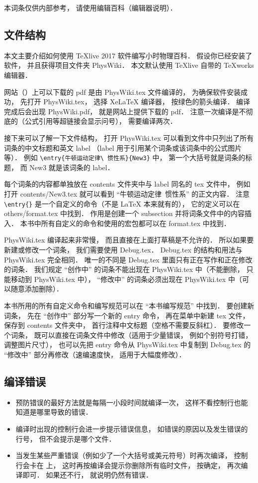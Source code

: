 
本词条仅供内部参考， 请使用编辑百科（编辑器说明）．

\subsection{文件结构}

本文主要介绍如何使用 TeXlive 2017 软件编写小时物理百科． 假设你已经安装了软件， 并且获得项目文件夹 PhysWiki． 本文默认使用 TeXlive 自带的 TeXworks 编辑器．

网站（）上可以下载的 pdf 是由 PhysWiki.tex 文件编译的， 为确保软件安装成功， 先打开 PhysWiki.tex， 选择 XeLaTeX 编译器， 按绿色的箭头编译． 编译完成后会出现 PhysWiki.pdf， 就是网站上提供下载的 pdf． 注意一次编译是不彻底的（公式引用等超链接会显示问号）， 需要编译两次．

接下来可以了解一下文件结构， 打开 PhysWiki.tex 可以看到文件中只列出了所有词条的中文标题和英文 label （label 用于引用某个词条或该词条中的公式图片等）． 例如 \lstinline|\entry{牛顿运动定律\ 惯性系}{New3}| 中， 第一个大括号就是词条的标题， 而 New3 就是该词条的 label．

每个词条的内容都单独放在 contents 文件夹中与 label 同名的 tex 文件中， 例如打开 contents/New3.tex 就可以看到 “牛顿运动定律\ 惯性系” 的正文内容． 注意 \lstinline|\entry{}| 是一个自定义的命令（不是 LaTeX 本来就有的）， 它的定义可以在 others/format.tex 中找到． 作用是创建一个 subsection 并将词条文件中的内容插入． 本书中所有自定义的命令和使用的宏包都可以在 format.tex 中找到．

PhysWiki.tex 编译起来非常慢， 而且直接在上面打草稿是不允许的． 所以如果要新建或修改一个词条， 我们需要使用 Debug.tex． Debug.tex 的结构和用法与 PhysWiki.tex 完全相同． 唯一的不同是 Debug.tex 里面只有正在写作和正在修改的词条． 我们规定 “创作中” 的词条不能出现在 PhysWiki.tex 中（不能删除， 只能移动到 PhysWiki.tex 中）， “修改中” 的词条必须出现在 PhysWiki.tex 中（可以随意添加删除）．

本书所用的所有自定义命令和编写规范可以在 “本书编写规范” 中找到． 要创建新词条， 先在 “创作中” 部分写一个新的 entry 命令， 再在菜单中新建 tex 文件， 保存到 contents 文件夹中， 首行注释中文标题（空格不需要反斜杠）． 要修改一个词条， 既可以直接在词条文件中修改（适用于少量错误， 例如个别符号打错， 调整图片尺寸）， 也可以先把 entry 命令从 PhysWiki.tex 中复制到 Debug.tex 的 “修改中” 部分再修改（速编速度快， 适用于大幅度修改）．

\subsection{编译错误}

\begin{itemize}
\item 预防错误的最好方法就是每隔一小段时间就编译一次， 这样不看控制行也能知道是哪里导致的错误．
\item 编译时出现的控制行会进一步提示错误信息， 如错误的原因以及发生错误的行号， 但不会提示是哪个文件．
\item 当发生某些严重错误（例如少了一个大括号或美元符号）时再次编译， 控制行会卡在 \lstinline|| 上， 这时再按编译会提示你删除所有临时文件， 按确定， 再次编译即可． 如果还不行， 就说明仍然有错误．
\end{itemize}
